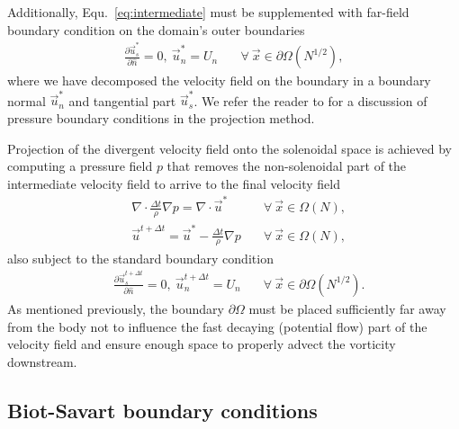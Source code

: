 \documentclass{article}
\begin{document}
Additionally, Equ.~\ref{eq:intermediate} must be supplemented with far-field boundary condition on the domain's outer boundaries
\begin{align}\label{eq:BC_1}
    \frac{\partial \vec{u}^*_s}{\partial \hat{n}} = 0,\ \vec{u}^*_n = U_n &\quad\forall\ \vec{x}\in\partial\Omega (N^{1/2}),
\end{align}
where we have decomposed the velocity field on the boundary in a boundary normal $\vec{u}^*_n$ and tangential part $\vec{u}^*_s$. We refer the reader to \cite{Gresho1987} for a discussion of pressure boundary conditions in the projection method.

Projection of the divergent velocity field onto the solenoidal space is achieved by computing a pressure field $p$ that removes the non-solenoidal part of the intermediate velocity field to arrive to the final velocity field
\begin{align}\label{eq:poisson}
      &\nabla\cdot\frac{\Delta t}{\rho}\nabla p = \nabla\cdot \vec{u}^* &\quad\forall\ \vec{x}\in\Omega (N),\\
      &\vec{u}^{t+\Delta t} = \vec{u}^*-\frac{\Delta t}{\rho}\nabla p &\quad\forall\ \vec{x}\in\Omega (N),
\end{align}
also subject to the standard boundary condition
\begin{align}\label{eq:BC_2}
      &\frac{\partial \vec{u}^{t+\Delta t}_s}{\partial \hat{n}} = 0,\ \vec{u}^{t+\Delta t}_n = U_n &\quad\forall\ \vec{x}\in\partial\Omega (N^{1/2}).
\end{align}
As mentioned previously, the boundary $\partial\Omega$ must be placed sufficiently far away from the body not to influence the fast decaying (potential flow) part of the velocity field and ensure enough space to properly advect the vorticity downstream. 

\subsection{Biot-Savart boundary conditions}

\end{document}
